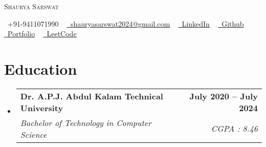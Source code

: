 \documentclass[letterpaper,11pt]{article}
\makeatletter
\newcommand{\resumeSubheading}[4]{
  \vspace{-2pt}\item
    \begin{tabular*}{1.0\textwidth}[t]{l@{\extracolsep{\fill}}r}
      \textbf{#1} & \textbf{\small #2} \\
      \textit{\small#3} & \textit{\small #4} \\
    \end{tabular*}\vspace{-7pt}
}
\newcommand{\resumeSubHeadingListStart}{\begin{itemize}[leftmargin=0.0in, label={}]}
\newcommand{\resumeSubHeadingListEnd}{\end{itemize}}
\makeatother
\begin{document}

\begin{center}
    {\Huge \scshape Shaurya Sarswat} \\ \vspace{1pt}
    
    \small \raisebox{-0.1\height}\faPhone\ +91-9411071990 ~ \href{mailto:shauryasarswat2024@gmail.com}{\raisebox{-0.2\height}\faEnvelope\  \underline{shauryasarswat2024@gmail.com}} ~ 
    \href{https://linkedin.com/in/ShauryaSarswat/}{\raisebox{-0.2\height}\faLinkedin\ \underline{LinkedIn}}  ~
    \href{https://github.com/ShauryaSarswat}{\raisebox{-0.2\height}\faGithub\ \underline{Github}} ~
    \href{https://portfolio-silk-alpha-44.vercel.app}
    {\raisebox{-0.2\height}\faUser\ \underline{Portfolio}} ~
    \href{https://leetcode.com/ShauryaSarswat/}
    {\raisebox{-0.2\height}\faCode\ \underline{LeetCode}}
    \vspace{-8pt}
\end{center}


\section{Education}
  \resumeSubHeadingListStart
    \resumeSubheading
      {Dr. A.P.J. Abdul Kalam Technical University}{July 2020 -- July 2024}
      {Bachelor of Technology in Computer Science}{CGPA : 8.46}
  \resumeSubHeadingListEnd

\end{document}
